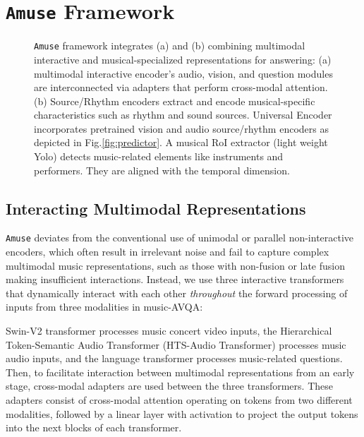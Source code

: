 \documentclass[11pt]{article}
\begin{document}
\section{\texttt{Amuse} Framework}
\begin{figure}
\begin{center}
\end{center}
\caption{\texttt{Amuse} framework integrates (a) and (b) combining multimodal interactive and musical-specialized representations for answering: (a) multimodal interactive encoder's audio, vision, and question modules are interconnected via adapters that perform cross-modal attention. (b) Source/Rhythm encoders extract and encode musical-specific characteristics such as rhythm and sound sources. Universal Encoder incorporates pretrained vision and audio source/rhythm encoders as depicted in Fig.\ref{fig:predictor}. A musical RoI extractor (light weight Yolo) detects music-related elements like instruments and performers. They are aligned with the temporal dimension. 
}
\vspace{-0.3cm}
\label{fig:amuse}
\end{figure}
\subsection{Interacting Multimodal Representations}
\texttt{Amuse} deviates from the conventional use of unimodal or parallel non-interactive encoders, which often result in irrelevant noise and fail to capture complex multimodal music representations, such as those with non-fusion or late fusion making insufficient interactions. Instead, we use three interactive transformers that dynamically interact with each other \textit{throughout} the forward processing of inputs from three modalities in music-AVQA: 

Swin-V2 transformer \cite{liu2022swin} processes music concert video inputs, the Hierarchical Token-Semantic Audio Transformer (HTS-Audio Transformer) \cite{chen2022hts} processes music audio inputs, and the language transformer \cite{NIPS2017_3f5ee243} processes music-related questions.
Then, to facilitate interaction between multimodal representations from an early stage, cross-modal adapters are used between the three transformers. These adapters consist of cross-modal attention operating on tokens from two different modalities, followed by a linear layer with activation to project the output tokens into the next blocks of each transformer.
\end{document}
